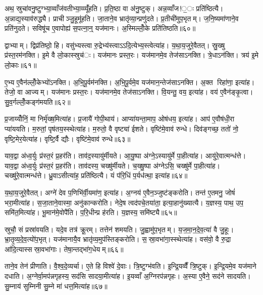 अथ॒ स्रुचा॑वनु॒ष्टुग्भ्या॒व्वाँज॑वतीभ्या॒व्व्यूँ॑हति। प्र॒ति॒ष्ठा वा अ॑नु॒ष्टुक्। अन्न॒व्वाँज!॒ः प्रति॑ष्ठित्यै। अ॒न्नाद्य॒स्याव॑रुद्ध्यै। प्राचीञ्जु॒हूमू॑हति। जा॒ताने॒व भ्रातृ॑व्या॒न्प्रणु॑दते। प्र॒तीची॑मुप॒भृतम्। ज॒नि॒ष्यमा॑णाने॒व प्रति॑नुदते। सविषू॑च ए॒वापोह्य॑ स॒पत्ना॒न्॒ यज॑मानः। अ॒स्मिल्लोँ॒के प्रति॑तिष्ठति॥६०॥

द्वाभ्याम्। द्विप्र॑तिष्ठो॒ हि। वसु॑भ्यस्त्वा रु॒द्रेभ्य॑स्त्वाऽऽदि॒त्येभ्य॒स्त्वेत्या॑ह। य॒था॒य॒जुरे॒वैतत्। स्रु॒ख्षु प्र॑स्त॒रम॑नक्ति। इ॒मे वै लो॒कास्स्रुच॑ः। यज॑मानः प्रस्त॒रः। यज॑मानमे॒व तेज॑साऽनक्ति। त्रे॒धाऽन॑क्ति। त्रय॑ इ॒मे लो॒काः॥६१॥

ए॒भ्य ए॒वैन॑ल्लोँ॒केभ्यो॑ऽनक्ति। अ॒भि॒पू॒र्वम॑नक्ति। अ॒भि॒पू॒र्वमे॒व यज॑मान॒न्तेज॑साऽनक्ति। अ॒क्त रिहा॑णा॒ इत्या॑ह। तेजो॒ वा आज्यम्। यज॑मानः प्रस्त॒रः। यज॑मानमे॒व तेज॑साऽनक्ति। वि॒यन्तु॒ वय॒ इत्या॑ह। वय॑ ए॒वैन॑ङ्कृ॒त्वा। सु॒व॒र्गल्लोँ॒कङ्ग॑मयति॥६२॥

प्र॒जाय्योँनिं॒ मा निर्मृ॑ख्ष॒मित्या॑ह। प्र॒जायै॑ गोपी॒थाय॑। आप्या॑यन्ता॒माप॒ ओष॑धय॒ इत्या॑ह। आप॑ ए॒वौष॑धी॒रा प्या॑ययति। म॒रुतां॒ पृष॑तय॒स्स्थेत्या॑ह। म॒रुतो॒ वै वृष्ट्या॑ ईशते। वृष्टि॑मे॒वाव॑ रुन्धे। दिव॑ङ्गच्छ॒ ततो॑ नो॒ वृष्टि॒मेर॒येत्या॑ह। वृष्टि॒र्वै द्यौः। वृष्टि॑मे॒वाव॑ रुन्धे॥६३॥

याव॒द्वा अ॑ध्व॒र्युः प्र॑स्त॒रं प्र॒हर॑ति। ताव॑द॒स्यायु॑र्मीयते। आ॒यु॒ष्पा अ॑ग्ने॒ऽस्यायु॑र्मे पा॒हीत्या॑ह। आयु॑रे॒वात्मन्ध॑त्ते। याव॒द्वा अ॑ध्व॒र्युः प्र॑स्त॒रं प्र॒हर॑ति। ताव॑दस्य॒ चख्षु॑र्मीयते। च॒ख्षु॒ष्पा अ॑ग्नेऽसि॒ चख्षु॑र्मे पा॒हीत्या॑ह। चख्षु॑रे॒वात्मन्ध॑त्ते। ध्रु॒वाऽसीत्या॑ह॒ प्रति॑ष्ठित्यै। यं प॑रि॒धिं प॒र्यध॑त्था॒ इत्या॑ह॥६४॥

य॒था॒य॒जुरे॒वैतत्। अग्ने॑ देव प॒णिभि॑र्वी॒यमा॑ण॒ इत्या॑ह। अ॒ग्नय॑ ए॒वैन॒ञ्जुष्ट॑ङ्करोति। तन्त॑ ए॒तमनु॒ जोषं॑ भरा॒मीत्या॑ह। स॒जा॒ताने॒वास्मा॒ अनु॑कान्करोति। नेदे॒ष त्वद॑पचे॒तया॑ता॒ इत्या॒हानु॑ख्यात्यै। य॒ज्ञस्य॒ पाथ॒ उप॒ समि॑त॒मित्या॑ह। भू॒मान॑मे॒वोपै॑ति। प॒रि॒धीन्प्र ह॑रति। य॒ज्ञस्य॒ समि॑ष्ट्यै॥६५॥

स्रुचौ॒ सं प्रस्रा॑वयति। यदे॒व तत्र॑ क्रू॒रम्। तत्तेन॑ शमयति। जु॒ह्वामु॑प॒भृतम्। य॒ज॒मा॒न॒दे॒व॒त्या॑ वै जु॒हूः। भ्रा॒तृ॒व्य॒दे॒व॒त्यो॑प॒भृत्। यज॑मानायै॒व भ्रातृ॑व्य॒मुप॑स्तिङ्करोति। स॒स्रा॒वभा॑गा॒स्स्थेत्या॑ह। वस॑वो॒ वै रु॒द्रा आ॑दि॒त्यास्सस्रा॒वभा॑गाः। तेषा॒न्तद्भा॑ग॒धेयम्॥६६॥

ताने॒व तेन॑ प्रीणाति। वै॒श्व॒दे॒व्यर्चा। ए॒ते हि विश्वे॑ दे॒वाः। त्रि॒ष्टुग्भ॑वति। इ॒न्द्रि॒यव्वैँ त्रि॒ष्टुक्। इ॒न्द्रि॒यमे॒व यज॑माने दधाति। अ॒ग्नेर्वा॒मप॑न्नगृहस्य॒ सद॑सि सादया॒मीत्या॑ह। इ॒यव्वाँ अ॒ग्निरप॑न्नगृहः। अ॒स्या ए॒वैने॒ सद॑ने सादयति। सु॒म्नाय॑ सुम्निनी सु॒म्ने मा॑ धत्त॒मित्या॑ह॥६७॥

